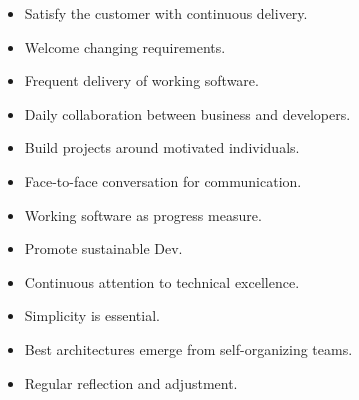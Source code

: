 \documentclass[10pt]{article}
\begin{document}
\begin{multicols}{5}
\begin{block}
    \begin{itemize}
        \item Satisfy the customer with continuous delivery.
        \item Welcome changing requirements.
        \item Frequent delivery of working software.
        \item Daily collaboration between business and developers.
        \item Build projects around motivated individuals.
        \item Face-to-face conversation for communication.
        \item Working software as progress measure.
        \item Promote sustainable Dev.
        \item Continuous attention to technical excellence.
        \item Simplicity is essential.
        \item Best architectures emerge from self-organizing teams.
        \item Regular reflection and adjustment.
    \end{itemize}
\end{block}


\end{multicols}
\end{document}

